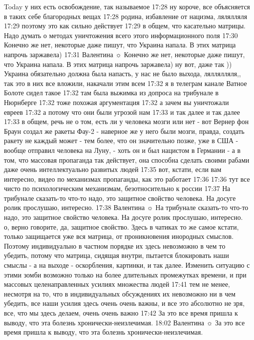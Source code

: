 Today
у них есть освобождение, так называемое
17:28
ну короче, все объясняется в таких себе благородных вещах
17:28
родина, избавление от нацизма, лялялляля
17:29
поэтому это как сильно действует
17:29
в общем, что касательно матрицы. Надо думать о методах уничтожения всего этого информационного поля
17:30
Конечно же нет, некоторые даже пишут, что Украина напала. В этих матрица напрочь заржавела)
17:31
Валентина ☼
Конечно же нет, некоторые даже пишут, что Украина напала. В этих матрица напрочь заржавела)
ну вот, даже так )) Украина обязательно должна была напасть, у нас не было выхода, ляллялляля,, так это в них все вложили, накачали этим всем
17:32
я в телеграм канале Ватное Болоте сидел такое
17:32
там была выжимка из допроса на трибунале в Нюрнберге
17:32
тоже похожая аргументация
17:32
а зачем вы уничтожали евреев
17:32
а потому что они были угрозой нам
17:33
и так далее и так далее
17:33
в общем, речь не о том, есть ли у человека мозги или нет - вот Вернер фон Браун создал же ракеты Фау-2 - наверное же у него были мозги, правда, создать ракету не каждый может - тем более, что он значительно позже, уже в США - вообще отправил человека на Луну, - хоть он и был нацистом в Германии - а в том, что массовая пропаганда так действует, она способна сделать своими рабами даже очень интеллектуально развитых людей
17:35
вот, кстати, если вам интересно, видео по механизмах пропаганды, как это работает
17:36
17:36
тут все чисто по психологическим механизмам, безотносительно к россии
17:37
На трибунале сказать-то что-то надо, это защитное свойство человека. На досуге ролик прослушаю, интересно.
17:38
Валентина ☼
На трибунале сказать-то что-то надо, это защитное свойство человека. На досуге ролик прослушаю, интересно.
о, верно говорите, да, защитное свойство. Здесь в чатиках то же самое кстати, только защищается уже вся матрица, от проникновения инородных смыслов. Поэтому индивидуально в частном порядке их здесь невозможно в чем то убедить, потому что матрица, сидящая внутри, пытается блокировать наши смыслы - а на выходе - оскорбления, картинки, и так далее. Изменить ситуацию с этими зомби возможно только на более длительных промежутках времени, и при массовых целенаправленных усилиях множества людей
17:41
тем не менее, несмотря на то, что в индивидуальных обсуждениях их невозможно ни в чем убедить, все наши усилия здесь очень очень важны, и все это абсолютно не зря, все, что мы здесь делаем, очень очень важно
17:42
За это все время пришла к выводу, что эта болезнь хронически-неизлечимая.
18:02
Валентина ☼
За это все время пришла к выводу, что эта болезнь хронически-неизлечимая.
